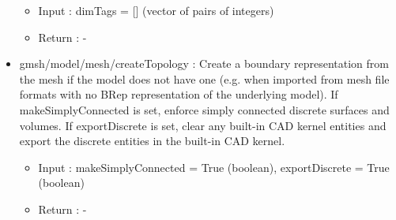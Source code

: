 \documentclass[dvipdfmx, 9pt, a4paper]{article}
\numberwithin{equation}{section}
\begin{document}
\begin{itemize}
\begin{itemize}
\item Input : dimTags = [] (vector of pairs of integers)
\item Return : -
\end{itemize}
\item gmsh/model/mesh/createTopology : Create a boundary representation from the mesh if the model does not have one (e.g. when imported from mesh file formats with no BRep representation of the underlying model). If makeSimplyConnected is set, enforce simply connected discrete surfaces and volumes. If exportDiscrete is set, clear any built-in CAD kernel entities and export the discrete entities in the built-in CAD kernel.
\begin{itemize}
\item Input : makeSimplyConnected = True (boolean), exportDiscrete = True (boolean)
\item Return : -
\end{itemize}
\end{itemize}
\end{document}
